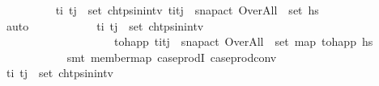 \begin{isabellebody}
\ \ \ \ \ \ \ \ \isamarkupfalse%
\ {\isachardoublequoteopen}{\isasymforall}{\isacharparenleft}{\kern0pt}t\isactrlsub i{\isacharcomma}{\kern0pt}\ t\isactrlsub j{\isacharparenright}{\kern0pt}\ {\isasymin}\ set\ {\isacharquery}{\kern0pt}chtps{\isacharunderscore}{\kern0pt}in{\isacharunderscore}{\kern0pt}intv{\isachardot}{\kern0pt}\ {\isacharparenleft}{\kern0pt}{\isacharparenleft}{\kern0pt}t\isactrlsub i{\isacharplus}{\kern0pt}t\isactrlsub j{\isacharparenright}{\kern0pt}\ {\isacharslash}{\kern0pt}\ {}{\isacharcomma}{\kern0pt}{\isacharquery}{\kern0pt}snap{\isacharunderscore}{\kern0pt}act\ Over{\isacharunderscore}{\kern0pt}All{\isacharparenright}{\kern0pt}\ {\isasymin}\ set\ {\isacharquery}{\kern0pt}hs\isanewline
\ \ \ \ \ \ \ \ \ \ \isamarkupfalse%
\ auto\isanewline
\ \ \ \ \ \ \ \ \isamarkupfalse%
\ \isamarkupfalse%
\ {\isachardoublequoteopen}{\isasymforall}{\isacharparenleft}{\kern0pt}t\isactrlsub i{\isacharcomma}{\kern0pt}\ t\isactrlsub j{\isacharparenright}{\kern0pt}\ {\isasymin}\ set\ {\isacharquery}{\kern0pt}chtps{\isacharunderscore}{\kern0pt}in{\isacharunderscore}{\kern0pt}intv{\isachardot}{\kern0pt}\ \isanewline
\ \ \ \ \ \ \ \ \ \ \ \ \ \ \ \ \ \ \ \ {\isacharquery}{\kern0pt}to{\isacharunderscore}{\kern0pt}happ\ {\isacharparenleft}{\kern0pt}{\isacharparenleft}{\kern0pt}t\isactrlsub i{\isacharplus}{\kern0pt}t\isactrlsub j{\isacharparenright}{\kern0pt}\ {\isacharslash}{\kern0pt}\ {}{\isacharcomma}{\kern0pt}{\isacharquery}{\kern0pt}snap{\isacharunderscore}{\kern0pt}act\ Over{\isacharunderscore}{\kern0pt}All{\isacharparenright}{\kern0pt}\ {\isasymin}\ set\ {\isacharparenleft}{\kern0pt}map\ {\isacharquery}{\kern0pt}to{\isacharunderscore}{\kern0pt}happ\ {\isacharquery}{\kern0pt}hs\isanewline
\ \ \ \ \ \ \ \ \ \ \isamarkupfalse%
\ {\isacharparenleft}{\kern0pt}smt\ member{\isacharunderscore}{\kern0pt}map\ case{\isacharunderscore}{\kern0pt}prodI{}\ case{\isacharunderscore}{\kern0pt}prod{\isacharunderscore}{\kern0pt}conv{\isacharparenright}{\kern0pt}\ \isanewline
\ \ \ \ \ \ \ \ \isamarkupfalse%
\ \isamarkupfalse%
\ {\isachardoublequoteopen}{\isasymforall}{\isacharparenleft}{\kern0pt}t\isactrlsub i{\isacharcomma}{\kern0pt}\ t\isactrlsub j{\isacharparenright}{\kern0pt}\ {\isasymin}\ set\ {\isacharquery}{\kern0pt}chtps{\isacharunderscore}{\kern0pt}in{\isacharunderscore}{\kern0pt}intv{\isachardot}{\kern0pt}\ \isanewline

\end{isabellebody}
